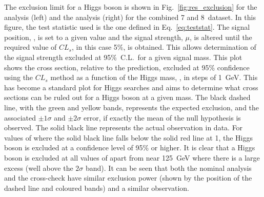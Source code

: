 The exclusion limit for a \SM Higgs boson is shown in Fig.~\ref{fig:res_exclusion} for the \MFM analysis (left) and the \SMVA analysis (right) for the combined 7 and 8~\TeV dataset. In this figure, the test statistic used is the one defined in Eq.~\ref{eq:teststat}. The signal position, \mH, is set to a given value and the signal strength, $\mu$, is altered until the required value of $CL_{s}$, in this case 5\%, is obtained. This allows determination of the signal strength excluded at 95\%~C.L.~for a given signal mass. This plot shows the cross section, relative to the \SM prediction, excluded at 95\% confidence using the $CL_{s}$ method as a function of the Higgs mass, \mH, in steps of 1~GeV. This has become a standard plot for Higgs searches and aims to determine what cross sections can be ruled out for a Higgs boson at a given mass. The black dashed line, with the green and yellow bands, represents the expected exclusion, and the associated $\pm1\sigma$ and $\pm2\sigma$ error, if exactly the mean of the null hypothesis is observed. The solid black line represents the actual observation in data. For values of \mH where the solid black line falls below the solid red line at 1, the \SM Higgs boson is excluded at a confidence level of 95\% or higher. It is clear that a \SM Higgs boson is excluded at all values of \mH apart from near 125~GeV where there is a large excess (well above the $2\sigma$ band).
It can be seen that both the nominal \MFM analysis and the cross-check \SMVA have similar exclusion power (shown by the position of the dashed line and coloured bands) and a similar observation.

